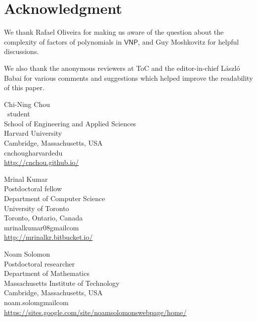 \documentclass{toc}
\newcommand{\ComplexityFont}[1]{{\ensuremath{\mathsf{#1}}}}
\newcommand{\VNP}{\ComplexityFont{VNP}}
\begin{document}
\section*{Acknowledgment}
We thank Rafael Oliveira for making us aware of the question about the complexity of factors of polynomials in $\VNP$, and Guy Moshkovitz for helpful discussions. 


We also thank the anonymous reviewers at ToC and the editor-in-chief L{\'a}szl{\'o} Babai for various comments and suggestions which helped improve the readability of this paper. 

\nocite{kalt85,Kal86,Kal87,k89}
\nocite{lidl}
\nocite{sy}

%

%
 
%
%
%


%
%
%
%
%
\begin{tocauthors}
\begin{tocinfo}[chou]
 Chi-Ning Chou\\
 \phd\ student\\
 School of Engineering and Applied Sciences\\
 Harvard University\\
 Cambridge, Massachusetts, USA\\
 cnchou\tocat{}g\tocdot{}harvard\tocdot{}edu \\   %
 \url{http://cnchou.github.io/}      %
\end{tocinfo}
\begin{tocinfo}[kumar]
  Mrinal Kumar\\
  Postdoctoral fellow\\
Department of Computer Science\\
University of Toronto \\
Toronto, Ontario, Canada\\   
  mrinalkumar08\tocat{}gmail\tocdot{}com\\
  \url{http://mrinalkr.bitbucket.io/}
\end{tocinfo}
\begin{tocinfo}[solomon]
  Noam Solomon\\
  Postdoctoral researcher\\
  Department of Mathematics\\
  Massachusetts Institute of Technology\\
  Cambridge, Massachusetts, USA\\
  noam.solom\tocat{}gmail\tocdot{}com\\
  \url{https://sites.google.com/site/noamsolomonswebpage/home/}
\end{tocinfo}
\end{tocauthors}
\end{document}
